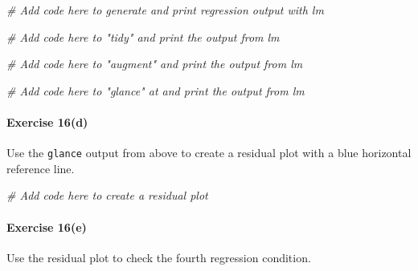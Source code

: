 \documentclass[
]{book}
\newenvironment{Shaded}{\begin{snugshade}}{\end{snugshade}}
\newcommand{\CommentTok}[1]{\textcolor[rgb]{0.56,0.35,0.01}{\textit{#1}}}
\begin{document}
\begin{Shaded}
\begin{Highlighting}[]
\CommentTok{\# Add code here to generate and print regression output with lm}
\end{Highlighting}
\end{Shaded}

\begin{Shaded}
\begin{Highlighting}[]
\CommentTok{\# Add code here to "tidy" and print the output from lm}
\end{Highlighting}
\end{Shaded}

\begin{Shaded}
\begin{Highlighting}[]
\CommentTok{\# Add code here to "augment" and print the output from lm}
\end{Highlighting}
\end{Shaded}

\begin{Shaded}
\begin{Highlighting}[]
\CommentTok{\# Add code here to "glance" at and print the output from lm}
\end{Highlighting}
\end{Shaded}

\hypertarget{exercise-16d}{%
\paragraph*{Exercise 16(d)}\label{exercise-16d}}

Use the \texttt{glance} output from above to create a residual plot with a blue horizontal reference line.

\begin{Shaded}
\begin{Highlighting}[]
\CommentTok{\# Add code here to create a residual plot}
\end{Highlighting}
\end{Shaded}

\hypertarget{exercise-16e}{%
\paragraph*{Exercise 16(e)}\label{exercise-16e}}

Use the residual plot to check the fourth regression condition.
\end{document}
